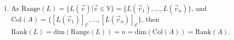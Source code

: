 \documentclass[10pt,english]{article}
\begin{document}
\begin{enumerate}
\begin{enumerate}
    \item As $\text{Range}(L)=\{L(\vec{v})|\vec{v}\in\mathbb{V}\}=\{L(\vec{v}_1),\ldots,L(\vec{v}_n)\}$, and $\text{Col}(A)=\{[L(\vec{v}_1)]_\mathcal{C},\ldots,[L(\vec{v}_n)]_\mathcal{C}\}$, then $\text{Rank}(L)=\text{dim}(\text{Range}(L))=n=\text{dim}(\text{Col}(A))=\text{Rank}(A)$. 
    
\end{enumerate}


\end{enumerate}
\end{document}
